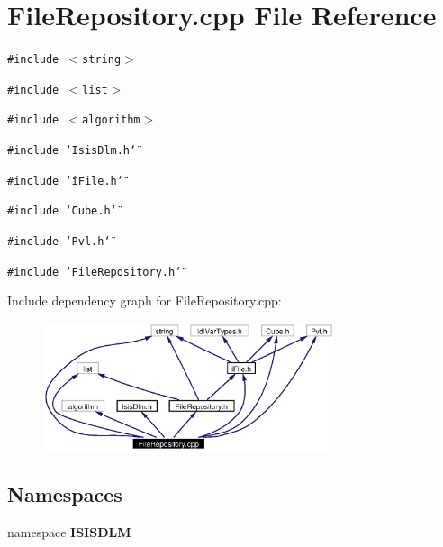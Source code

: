 \section{File\-Repository.cpp File Reference}
\label{FileRepository_8cpp}
{\tt \#include $<$string$>$}\par
{\tt \#include $<$list$>$}\par
{\tt \#include $<$algorithm$>$}\par
{\tt \#include \char`\"{}Isis\-Dlm.h\char`\"{}}\par
{\tt \#include \char`\"{}i\-File.h\char`\"{}}\par
{\tt \#include \char`\"{}Cube.h\char`\"{}}\par
{\tt \#include \char`\"{}Pvl.h\char`\"{}}\par
{\tt \#include \char`\"{}File\-Repository.h\char`\"{}}\par


Include dependency graph for File\-Repository.cpp:\begin{figure}[H]
\begin{center}
\leavevmode
\includegraphics[width=242pt]{FileRepository_8cpp__incl}
\end{center}
\end{figure}
\subsection*{Namespaces}
\begin{CompactItemize}
\item 
namespace {\bf ISISDLM}
\end{CompactItemize}
